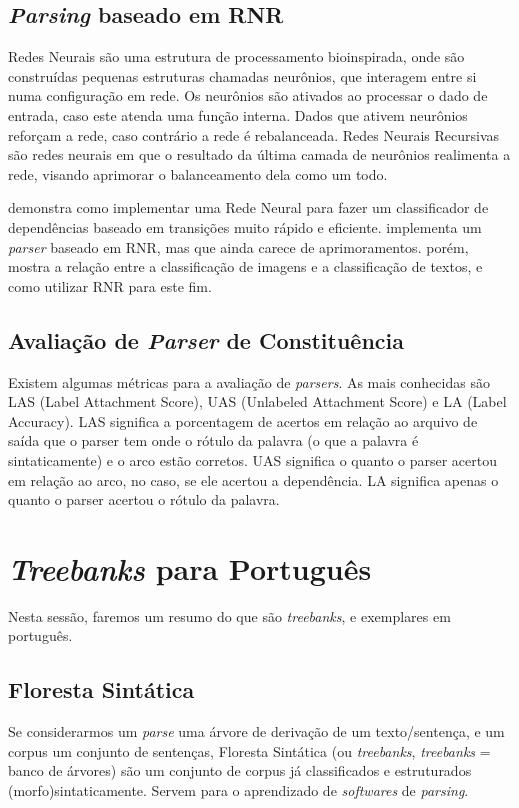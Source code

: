 \section{\textit{Parsing} baseado em RNR}
Redes Neurais são uma estrutura de processamento bioinspirada, onde são construídas pequenas estruturas chamadas neurônios, que interagem entre si numa configuração em rede. Os neurônios são ativados ao processar o dado de entrada, caso este atenda uma função interna. Dados que ativem neurônios reforçam a rede, caso contrário a rede é rebalanceada. Redes Neurais Recursivas são redes neurais em que o resultado da última camada de neurônios realimenta a rede, visando aprimorar o balanceamento dela como um todo. 

\citeauthor{fastAccurate} demonstra como implementar uma Rede Neural para fazer um classificador de dependências baseado em transições muito rápido e eficiente. \citeauthor{Pontus2013RNN} implementa um \textit{parser} baseado em RNR, mas que ainda carece de aprimoramentos. \citeauthor{Socher:2011:PNS:3104482.3104499} porém, mostra a relação entre a classificação de imagens e a classificação de textos, e como utilizar RNR para este fim.

\section{Avaliação de \textit{Parser} de Constituência}
Existem algumas métricas para a avaliação de \textit{parsers}. As mais conhecidas são  LAS (Label Attachment Score), UAS (Unlabeled Attachment Score) e LA (Label Accuracy). \cite{analisadoresLN} LAS significa a porcentagem de acertos em relação ao arquivo de saída que o parser tem onde o rótulo da palavra (o que a palavra é sintaticamente) e o arco estão corretos. UAS significa o quanto o parser acertou em relação ao arco, no caso, se ele acertou a dependência. LA significa apenas o quanto o parser acertou o rótulo da palavra.

\chapter{\textit{Treebanks} para Português}
Nesta sessão, faremos um resumo do que são \textit{treebanks}, e exemplares em português.
\section{Floresta Sintática}
Se considerarmos um \textit{parse} uma árvore de derivação de um texto/sentença, e um corpus um conjunto de sentenças, Floresta Sintática (ou \textit{treebanks}, \textit{treebanks} = banco de árvores) são um conjunto de corpus já classificados e estruturados (morfo)sintaticamente. Servem para o aprendizado de \textit{softwares} de \textit{parsing}.

